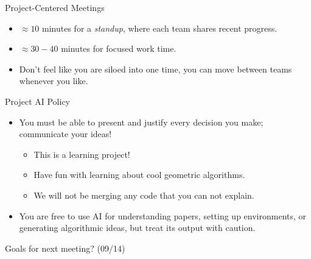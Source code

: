\documentclass[aspectratio=169]{beamer}
\begin{document}
\begin{frame}{Project-Centered Meetings}
    \begin{itemize}
        \item $\approx 10$ minutes for a \emph{standup}, where each team shares recent progress.
        \item $\approx 30-40$ minutes for focused work time.
        \item Don't feel like you are siloed into one time, you can move between teams whenever you like.
    \end{itemize}
\end{frame}

\begin{frame}{Project AI Policy}
    \begin{itemize}
        \item You must be able to present and justify every decision you make; communicate your ideas!
              \begin{itemize}
                  \item This is a learning project!
                  \item Have fun with learning about cool geometric algorithms.
                  \item We will not be merging any code that you can not explain.
              \end{itemize}
        \item You are free to use AI for understanding papers, setting up environments, or generating algorithmic ideas, but treat its output with caution.
    \end{itemize}
\end{frame}

\begin{frame}{Goals for next meeting? (09/14)}
\end{frame}
\end{document}
